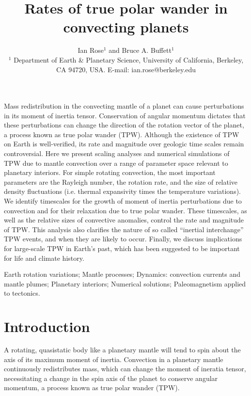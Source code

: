 \documentclass[extra,mreferee]{gji}
\title[TPW Rates]
  {Rates of true polar wander in convecting planets}
\author[I. Rose and B. Buffett]
  {Ian Rose$^1$ and Bruce A. Buffett$^1$ \\
  $^1$ Department of Earth \& Planetary Science, University of California, Berkeley, CA 94720, USA.  E-mail: ian.rose@berkeley.edu
  }
\date{}
\begin{document}
\label{firstpage}

\maketitle

\begin{summary}
Mass redistribution in the convecting mantle of a planet can cause perturbations in its moment of inertia tensor. 
Conservation of angular momentum dictates that these perturbations can change the direction of the rotation vector of the planet, a process known as true polar wander (TPW). 
Although the existence of TPW on Earth is well-verified, its rate and magnitude over geologic time scales remain controversial. 
Here we present scaling analyses and numerical simulations of TPW due to mantle convection over a range of parameter space relevant to planetary interiors. 
For simple rotating convection, the most important parameters are the Rayleigh number, the rotation rate, and the size of relative density fluctuations (i.e. thermal expansivity times the temperature variations). 
We identify timescales for the growth of moment of inertia perturbations due to convection and for their relaxation due to true polar wander. 
These timescales, as well as the relative sizes of convective anomalies, control the rate and magnitude of TPW.
This analysis also clarifies the nature of so called ``inertial interchange'' TPW events, and when they are likely to occur.
Finally, we discuss implications for large-scale TPW in Earth's past, which has been suggested to be important for life and climate history.
\end{summary}

\begin{keywords}
Earth rotation variations; Mantle processes; Dynamics: convection currents and mantle plumes; Planetary interiors; Numerical solutions; Paleomagnetism applied to tectonics.
\end{keywords}

\section{Introduction}
\label{sec:intro}

A rotating, quasistatic body like a planetary mantle will tend to spin about the axis of its maximum moment of inertia.
Convection in a planetary mantle continuously redistributes mass, which can change the moment of ineratia tensor, necessitating a change in the spin axis of the planet to conserve angular momentum, a process known as true polar wander (TPW).
\end{document}
